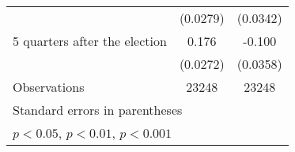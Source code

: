 \begin{table}[htbp]
\begin{tabular}{l*{2}{c}}
                    &    (0.0279)         &    (0.0342)         \\
[1em]
 5 quarters after the election&       0.176\sym{***}&      -0.100\sym{**} \\
                    &    (0.0272)         &    (0.0358)         \\
\hline
Observations        &       23248         &       23248         \\
\hline\hline
\multicolumn{3}{l}{\footnotesize Standard errors in parentheses}\\
\multicolumn{3}{l}{\footnotesize \sym{*} \(p<0.05\), \sym{**} \(p<0.01\), \sym{***} \(p<0.001\)}\\
\end{tabular}
\end{table}
